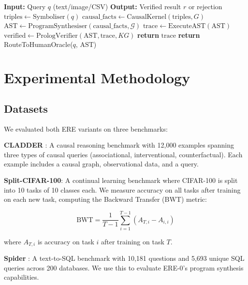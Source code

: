\documentclass{article}
\begin{document}
\begin{algorithm}[t]
\caption{ERE-0 Inference Pipeline}
\label{alg:ere0_inference}
\begin{algorithmic}[1]
\STATE \textbf{Input:} Query $q$ (text/image/CSV)
\STATE \textbf{Output:} Verified result $r$ or rejection
\STATE $\text{triples} \leftarrow \text{Symboliser}(q)$
\STATE $\text{causal\_facts} \leftarrow \text{CausalKernel}(\text{triples}, G)$
\STATE $\text{AST} \leftarrow \text{ProgramSynthesiser}(\text{causal\_facts}, \mathcal{G})$
\STATE $\text{trace} \leftarrow \text{ExecuteAST}(\text{AST})$
\STATE $\text{verified} \leftarrow \text{PrologVerifier}(\text{AST}, \text{trace}, KG)$
    \STATE \textbf{return} $\text{trace}$
\ELSE
    \STATE \textbf{return} RouteToHumanOracle($q$, $\text{AST}$)
\ENDIF
\end{algorithmic}
\end{algorithm}

\section{Experimental Methodology}

\subsection{Datasets}

We evaluated both ERE variants on three benchmarks:

\textbf{CLADDER} : A causal reasoning benchmark with 12,000 examples spanning three types of causal queries (associational, interventional, counterfactual). Each example includes a causal graph, observational data, and a query.

\textbf{Split-CIFAR-100}: A continual learning benchmark where CIFAR-100 is split into 10 tasks of 10 classes each. We measure accuracy on all tasks after training on each new task, computing the Backward Transfer (BWT) metric:

\begin{equation}
\text{BWT} = \frac{1}{T-1} \sum_{i=1}^{T-1} (A_{T,i} - A_{i,i})
\end{equation}

where $A_{T,i}$ is accuracy on task $i$ after training on task $T$.

\textbf{Spider} : A text-to-SQL benchmark with 10,181 questions and 5,693 unique SQL queries across 200 databases. We use this to evaluate ERE-0's program synthesis capabilities.
\end{document}
